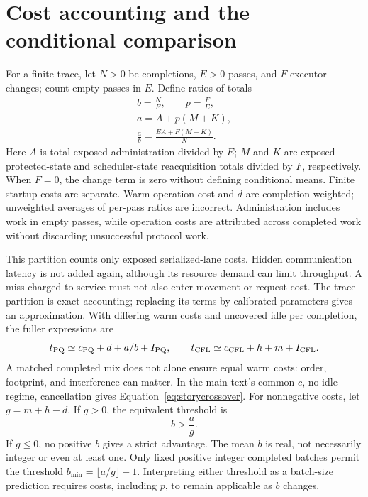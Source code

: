 \section{Cost accounting and the conditional comparison}
\label{app:costs}
For a finite trace, let $N>0$ be completions, $E>0$ passes, and $F$ executor
changes; count empty passes in $E$. Define ratios of totals
\begin{equation}
 \begin{gathered}
 b=\frac{N}{E},\qquad p=\frac{F}{E},\\
 a=A+p(M+K),\\
 \frac{a}{b}=\frac{EA+F(M+K)}{N}.
 \end{gathered}
 \label{eq:appendixmapping}
\end{equation}
Here $A$ is total exposed administration divided by $E$; $M$ and $K$ are
exposed protected-state and scheduler-state reacquisition totals divided by
$F$, respectively. When $F=0$, the change term is zero without defining
conditional means. Finite startup costs are separate. Warm operation cost
and $d$ are completion-weighted; unweighted averages of per-pass ratios are
incorrect. Administration includes work in empty passes, while operation
costs are attributed across completed work without discarding unsuccessful
protocol work.

This partition counts only exposed serialized-lane costs. Hidden communication
latency is not added again, although its resource demand can limit throughput.
A miss charged to service must not also enter movement or request cost.
The trace partition is exact accounting; replacing its terms by calibrated
parameters gives an approximation. With differing warm costs and uncovered
idle per completion, the fuller expressions are
\begin{equation}
 t_{\rm PQ}\simeq c_{\rm PQ}+d+a/b+I_{\rm PQ},\qquad
 t_{\rm CFL}\simeq c_{\rm CFL}+h+m+I_{\rm CFL}.
\end{equation}
A matched completed mix does not alone ensure equal warm costs: order,
footprint, and interference can matter. In the main text's common-$c$,
no-idle regime, cancellation gives Equation~\eqref{eq:storycrossover}.
For nonnegative costs, let $g=m+h-d$. If $g>0$, the equivalent threshold is
\begin{equation}
 b>\frac{a}{g}.
 \label{eq:appendixthreshold}
\end{equation}
If $g\le0$, no positive $b$ gives a strict advantage.
The mean $b$ is real, not necessarily integer or even at least one. Only
fixed positive integer completed batches permit the threshold
$b_{\min}=\lfloor a/g\rfloor+1$. Interpreting either threshold as a batch-size
prediction requires costs, including $p$, to remain applicable as $b$ changes.

